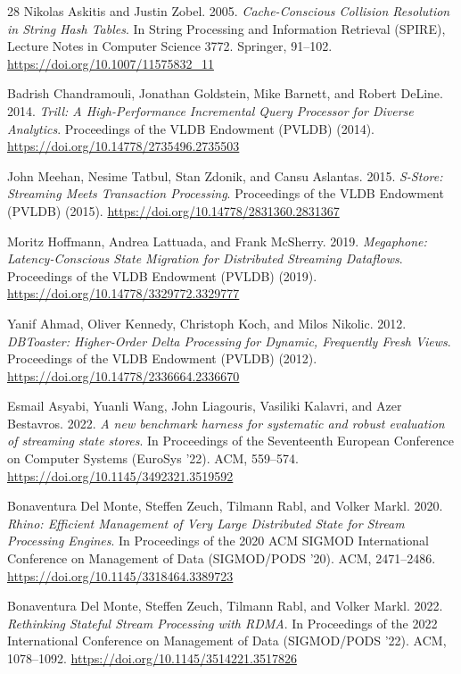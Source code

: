 \documentclass[sigconf]{acmart}
\begin{document}
\begin{thebibliography}{28}
Nikolas Askitis and Justin Zobel.
2005.
\textit{Cache-Conscious Collision Resolution in String Hash Tables}.
In String Processing and Information Retrieval (SPIRE), Lecture Notes in Computer Science 3772. Springer, 91--102.
\url{https://doi.org/10.1007/11575832_11}

Badrish Chandramouli, Jonathan Goldstein, Mike Barnett, and Robert DeLine.
2014.
\textit{Trill: A High-Performance Incremental Query Processor for Diverse Analytics}.
Proceedings of the VLDB Endowment (PVLDB) (2014).
\url{https://doi.org/10.14778/2735496.2735503}

John Meehan, Nesime Tatbul, Stan Zdonik, and Cansu Aslantas.
2015.
\textit{S-Store: Streaming Meets Transaction Processing}.
Proceedings of the VLDB Endowment (PVLDB) (2015).
\url{https://doi.org/10.14778/2831360.2831367}

Moritz Hoffmann, Andrea Lattuada, and Frank McSherry.
2019.
\textit{Megaphone: Latency-Conscious State Migration for Distributed Streaming Dataflows}.
Proceedings of the VLDB Endowment (PVLDB) (2019).
\url{https://doi.org/10.14778/3329772.3329777}

Yanif Ahmad, Oliver Kennedy, Christoph Koch, and Milos Nikolic.
2012.
\textit{DBToaster: Higher-Order Delta Processing for Dynamic, Frequently Fresh Views}.
Proceedings of the VLDB Endowment (PVLDB) (2012).
\url{https://doi.org/10.14778/2336664.2336670}

Esmail Asyabi, Yuanli Wang, John Liagouris, Vasiliki Kalavri, and Azer Bestavros.
2022.
\textit{A new benchmark harness for systematic and robust evaluation of streaming state stores}.
In Proceedings of the Seventeenth European Conference on Computer Systems (EuroSys '22). ACM, 559--574.
\url{https://doi.org/10.1145/3492321.3519592}

Bonaventura Del Monte, Steffen Zeuch, Tilmann Rabl, and Volker Markl.
2020.
\textit{Rhino: Efficient Management of Very Large Distributed State for Stream Processing Engines}.
In Proceedings of the 2020 ACM SIGMOD International Conference on Management of Data (SIGMOD/PODS '20). ACM, 2471--2486.
\url{https://doi.org/10.1145/3318464.3389723}

Bonaventura Del Monte, Steffen Zeuch, Tilmann Rabl, and Volker Markl.
2022.
\textit{Rethinking Stateful Stream Processing with RDMA}.
In Proceedings of the 2022 International Conference on Management of Data (SIGMOD/PODS '22). ACM, 1078--1092.
\url{https://doi.org/10.1145/3514221.3517826}


\end{thebibliography}
\end{document}
